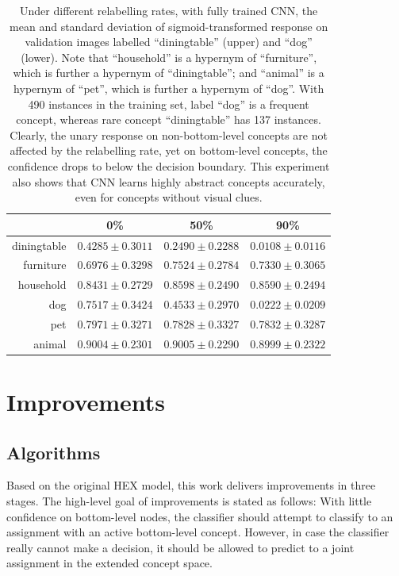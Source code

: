 \documentclass[11pt,a4paper]{article}
\begin{document}
\begin{table}[htbp]
\centering
\begin{tabular}{r|c|c|c}
 & 0\% & 50\% & 90\%\\
\hline
diningtable & $0.4285\pm0.3011$ & $0.2490\pm0.2288$ & $0.0108\pm0.0116$\\
furniture & $0.6976\pm0.3298$ & $0.7524\pm0.2784$ & $0.7330\pm0.3065$\\
household & $0.8431\pm0.2729$ & $0.8598\pm0.2490$ & $0.8590\pm0.2494$\\
\hline
dog & $0.7517\pm0.3424$ & $0.4533\pm0.2970$ & $0.0222\pm0.0209$\\
pet & $0.7971\pm0.3271$ & $0.7828\pm0.3327$ & $0.7832\pm0.3287$\\
animal & $0.9004\pm0.2301$ & $0.9005\pm0.2290$ & $0.8999\pm0.2322$
\end{tabular}
\caption{Under different relabelling rates, with fully trained CNN, the mean and standard deviation of sigmoid-transformed response on validation images labelled ``diningtable'' (upper) and ``dog'' (lower). Note that ``household'' is a hypernym of ``furniture'', which is further a hypernym of ``diningtable''; and ``animal'' is a hypernym of ``pet'', which is further a hypernym of ``dog''. With 490 instances in the training set, label ``dog'' is a frequent concept, whereas rare concept ``diningtable'' has 137 instances. Clearly, the unary response on non-bottom-level concepts are not affected by the relabelling rate, yet on bottom-level concepts, the confidence drops to below the decision boundary. This experiment also shows that CNN learns highly abstract concepts accurately, even for concepts without visual clues.}
\end{table}

\clearpage
\section{Improvements}
\subsection{Algorithms}

Based on the original HEX model, this work delivers improvements in three stages. The high-level goal of improvements is stated as follows: With little confidence on bottom-level nodes, the classifier should attempt to classify to an assignment with an active bottom-level concept. However, in case the classifier really cannot make a decision, it should be allowed to predict to a joint assignment in the extended concept space.
\end{document}
